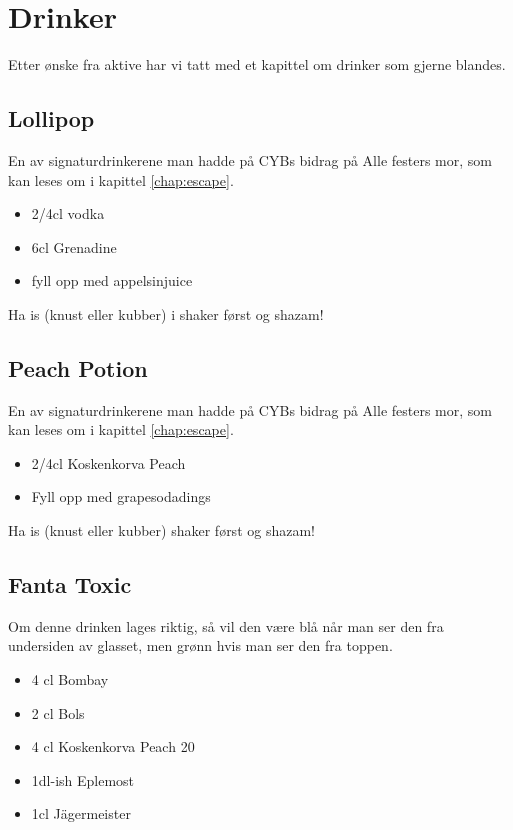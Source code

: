 \chapter*{Drinker}

Etter ønske fra aktive har vi tatt med et kapittel om drinker som gjerne blandes.

\section*{Lollipop}

En av signaturdrinkerene man hadde på CYBs bidrag på Alle festers mor, som kan leses om i kapittel \ref{chap:escape}.

\begin{itemize}
	\item 2/4cl vodka
	\item 6cl Grenadine
	\item fyll opp med appelsinjuice
\end{itemize}

Ha is (knust eller kubber) i shaker først og shazam!

\section*{Peach Potion}

En av signaturdrinkerene man hadde på CYBs bidrag på Alle festers mor, som kan leses om i kapittel \ref{chap:escape}.

\begin{itemize}
	\item 2/4cl Koskenkorva Peach
	\item Fyll opp med grapesodadings
\end{itemize}

Ha is (knust eller kubber) shaker først og shazam!

\section*{Fanta Toxic}

Om denne drinken lages riktig, så vil den være blå når man ser den fra undersiden av glasset, men grønn hvis man ser den fra toppen.

\begin{itemize}
	\item 4 cl Bombay
	\item 2 cl Bols
	\item 4 cl Koskenkorva Peach 20%
	\item 1dl-ish Eplemost
	\item 1cl Jägermeister
\end{itemize}

